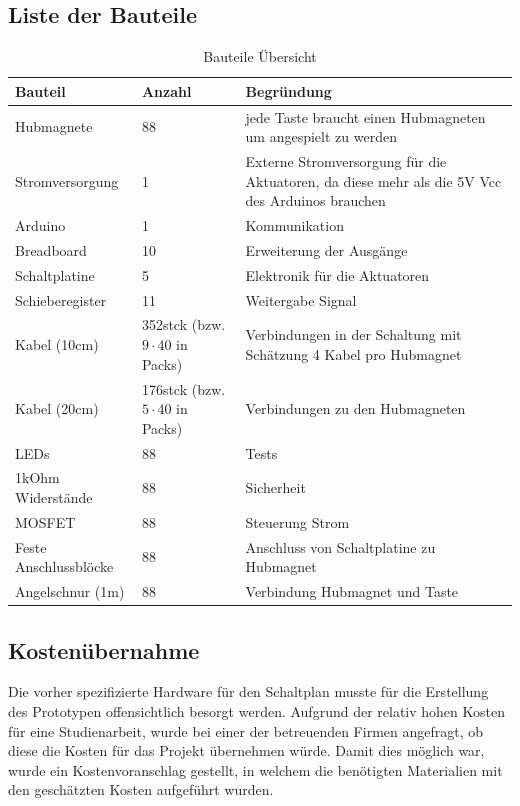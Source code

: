 \subsection{Liste der Bauteile}
\begin{table}[htbp]
    \centering
    \begin{tabular}{|m{3.8cm}|m{1.7cm}|m{8cm}|}
        \hline
        \textbf{Bauteil} &  \textbf{Anzahl} & \textbf{Begründung}  \\
        \hline
        Hubmagnete & 88 & jede Taste braucht einen Hubmagneten um angespielt zu werden \\ %
        \hline
        Stromversorgung & 1 & Externe Stromversorgung für die Aktuatoren, da diese mehr als die 5V Vcc des Arduinos brauchen \\
        \hline
        Arduino & 1 & Kommunikation \\
        \hline
        Breadboard & 10 & Erweiterung der Ausgänge \\
        \hline
        Schaltplatine & 5 & Elektronik für die Aktuatoren\\
        \hline
        Schieberegister & 11 & Weitergabe Signal\\
        \hline
        Kabel (10cm) & 352stck (bzw. $9\cdot40$ in Packs) & Verbindungen in der Schaltung mit Schätzung 4 Kabel pro Hubmagnet\\
        \hline
        Kabel (20cm) & 176stck (bzw.$5\cdot40$ in Packs) & Verbindungen zu den Hubmagneten \\
        \hline
        LEDs & 88 & Tests \\
        \hline
        1kOhm Widerstände & 88 & Sicherheit \\
        \hline
        MOSFET & 88 & Steuerung Strom \\
        \hline
        Feste Anschlussblöcke & 88 & Anschluss von Schaltplatine zu Hubmagnet\\
        \hline
        Angelschnur (1m) & 88 & Verbindung Hubmagnet und Taste \\
        \hline
    \end{tabular}
    \caption{Bauteile Übersicht}
    \label{table:Bauteile}
\end{table}

\subsection{Kostenübernahme}
Die vorher spezifizierte Hardware für den Schaltplan musste für die Erstellung des Prototypen offensichtlich besorgt werden.
Aufgrund der relativ hohen Kosten für eine Studienarbeit, wurde bei einer der betreuenden Firmen angefragt, ob diese die Kosten für das Projekt übernehmen würde.
Damit dies möglich war, wurde ein Kostenvoranschlag gestellt, in welchem die benötigten Materialien mit den geschätzten Kosten aufgeführt wurden.

